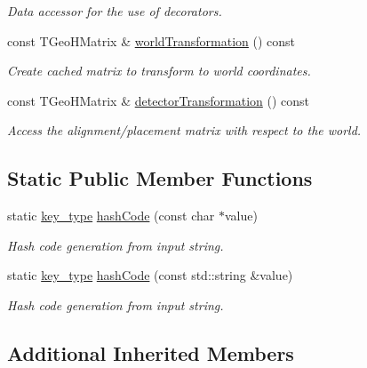 \begin{DoxyCompactItemize}
\begin{DoxyCompactList}\small\item\em Data accessor for the use of decorators. \end{DoxyCompactList}\item 
const T\+Geo\+H\+Matrix \& \hyperlink{class_d_d4hep_1_1_alignments_1_1_alignment_a36b6f1a62fba3bee327eb4c2a19f89ae}{world\+Transformation} () const
\begin{DoxyCompactList}\small\item\em Create cached matrix to transform to world coordinates. \end{DoxyCompactList}\item 
const T\+Geo\+H\+Matrix \& \hyperlink{class_d_d4hep_1_1_alignments_1_1_alignment_a8aae88c06deba1f46de0412c70399d6c}{detector\+Transformation} () const
\begin{DoxyCompactList}\small\item\em Access the alignment/placement matrix with respect to the world. \end{DoxyCompactList}\end{DoxyCompactItemize}
\subsection*{Static Public Member Functions}
\begin{DoxyCompactItemize}
\item 
static \hyperlink{class_d_d4hep_1_1_alignments_1_1_alignment_ab824a65f935a0c79b9ea1a7a85014b88}{key\+\_\+type} \hyperlink{class_d_d4hep_1_1_alignments_1_1_alignment_a18d349855ba9d9d8ae27949f9fbc020f}{hash\+Code} (const char $\ast$value)
\begin{DoxyCompactList}\small\item\em Hash code generation from input string. \end{DoxyCompactList}\item 
static \hyperlink{class_d_d4hep_1_1_alignments_1_1_alignment_ab824a65f935a0c79b9ea1a7a85014b88}{key\+\_\+type} \hyperlink{class_d_d4hep_1_1_alignments_1_1_alignment_af5a53c031ebc0778ce96097696b4055c}{hash\+Code} (const std\+::string \&value)
\begin{DoxyCompactList}\small\item\em Hash code generation from input string. \end{DoxyCompactList}\end{DoxyCompactItemize}
\subsection*{Additional Inherited Members}


